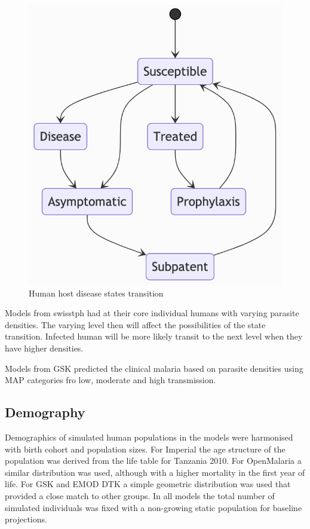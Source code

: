 \documentclass[a4paper, 12pt, twoside]{article}
\begin{document}
\begin{figure}[t]
	\centering
	\includegraphics[keepaspectratio=true, scale=0.8]{images/disease-state-transition-diagram.png}
	\caption{Human host disease states transition}
\end{figure}

Models from \gls{swisstph} had at their core individual humans with varying parasite densities. The varying level then will affect the possibilities of the state transition. Infected human will be more likely transit to the next level when they have higher densities.

Models from GSK predicted the clinical malaria based on parasite densities using MAP categories fro low, moderate and high transmission.\cite{Hay2004}

\subsection{Demography}
Demographics of simulated human populations in the models were harmonised with birth cohort and population sizes.
For Imperial the age structure of the population was derived from the life table for Tanzania 2010.
For OpenMalaria a similar distribution was used, although with a higher mortality in the first year of life.
For GSK and EMOD DTK a simple geometric distribution was used that provided a close match to other groups.
In all models the total number of simulated individuals was fixed with a non-growing static population for baseline projections.
\end{document}
